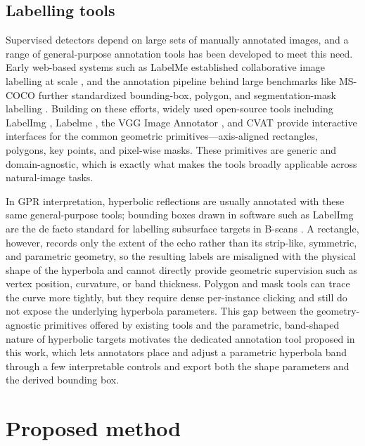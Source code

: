 \documentclass[lettersize,journal]{IEEEtran}
\begin{document}
\subsection{Labelling tools}
Supervised detectors depend on large sets of manually annotated images, and a range of general-purpose annotation tools has been developed to meet this need. Early web-based systems such as LabelMe established collaborative image labelling at scale \cite{russell2008labelme}, and the annotation pipeline behind large benchmarks like MS-COCO further standardized bounding-box, polygon, and segmentation-mask labelling \cite{lin2014coco}. Building on these efforts, widely used open-source tools including LabelImg \cite{tzutalin2015labelimg}, Labelme \cite{wada2016labelme}, the VGG Image Annotator \cite{dutta2019via}, and CVAT \cite{cvat} provide interactive interfaces for the common geometric primitives---axis-aligned rectangles, polygons, key points, and pixel-wise masks. These primitives are generic and domain-agnostic, which is exactly what makes the tools broadly applicable across natural-image tasks.

In GPR interpretation, hyperbolic reflections are usually annotated with these same general-purpose tools; bounding boxes drawn in software such as LabelImg are the de facto standard for labelling subsurface targets in B-scans \cite{CBAM}. A rectangle, however, records only the extent of the echo rather than its strip-like, symmetric, and parametric geometry, so the resulting labels are misaligned with the physical shape of the hyperbola and cannot directly provide geometric supervision such as vertex position, curvature, or band thickness. Polygon and mask tools can trace the curve more tightly, but they require dense per-instance clicking and still do not expose the underlying hyperbola parameters. This gap between the geometry-agnostic primitives offered by existing tools and the parametric, band-shaped nature of hyperbolic targets motivates the dedicated annotation tool proposed in this work, which lets annotators place and adjust a parametric hyperbola band through a few interpretable controls and export both the shape parameters and the derived bounding box.


\section{Proposed method}
\end{document}
